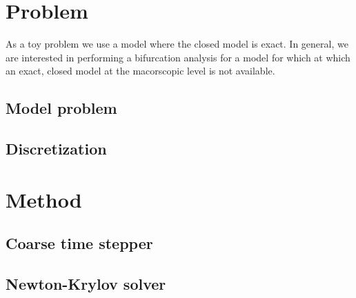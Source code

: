 \documentclass[]{article}
\theoremstyle{definition}
\begin{document}
\begin{abstract}


\end{abstract}

\section{Problem}

 As a toy problem we use a model where the closed model is exact. In general, we are interested in performing a bifurcation analysis for a model for which at which an exact, closed model at the macorscopic level is not available.
\subsection{Model problem}



\subsection{Discretization}


\section{Method}
\subsection{Coarse time stepper}



\subsection{Newton-Krylov solver} \label{sec:Newton-Krylov}
\end{document}
